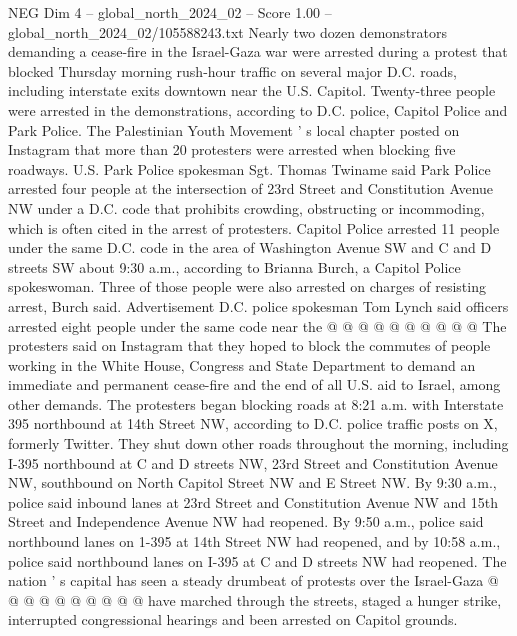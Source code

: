 \begin{textsample}{NEG Dim 4 – global\_north\_2024\_02 – Score 1.00 – global\_north\_2024\_02/105588243.txt}  \label{ex:f4_neg_286}
Nearly two dozen demonstrators demanding a cease-fire in the Israel-Gaza war were arrested during a protest that blocked Thursday morning rush-hour traffic on several major D.C. roads, including interstate exits downtown near the U.S.
Capitol.
Twenty-three people were arrested in the demonstrations, according to D.C. police, Capitol Police and Park Police.
The Palestinian Youth Movement ' s local chapter posted on Instagram that more than 20 protesters were arrested when blocking five roadways.
U.S.
Park Police spokesman Sgt.
Thomas Twiname said Park Police arrested four people at the intersection of 23rd Street and Constitution Avenue NW under a D.C. code that prohibits crowding, obstructing or incommoding, which is often cited in the arrest of protesters.
Capitol Police arrested 11 people under the same D.C. code in the area of Washington Avenue SW and C and D streets SW about 9:30 a.m., according to Brianna Burch, a Capitol Police spokeswoman.
Three of those people were also arrested on charges of resisting arrest, Burch said.
Advertisement D.C. police spokesman Tom Lynch said officers arrested eight people under the same code near the @ @ @ @ @ @ @ @ @ @ The protesters said on Instagram that they hoped to block the commutes of people working in the White House, Congress and State Department to demand an immediate and permanent cease-fire and the end of all U.S. aid to Israel, among other demands.
The protesters began blocking roads at 8:21 a.m. with Interstate 395 northbound at 14th Street NW, according to D.C. police traffic posts on X, formerly Twitter.
They shut down other roads throughout the morning, including I-395 northbound at C and D streets NW, 23rd Street and Constitution Avenue NW, southbound on North Capitol Street NW and E Street NW.
By 9:30 a.m., police said inbound lanes at 23rd Street and Constitution Avenue NW and 15th Street and Independence Avenue NW had reopened.
By 9:50 a.m., police said northbound lanes on 1-395 at 14th Street NW had reopened, and by 10:58 a.m., police said northbound lanes on I-395 at C and D streets NW had reopened.
The nation ' s capital has seen a steady drumbeat of protests over the Israel-Gaza @ @ @ @ @ @ @ @ @ @ have marched through the streets, staged a hunger strike, interrupted congressional hearings and been arrested on Capitol grounds.

\end{textsample}
